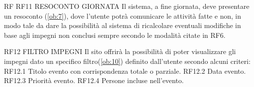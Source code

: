 \begin {listaPersonale}{RF}
RF11 RESOCONTO GIORNATA
Il sistema, a fine giornata, deve presentare un resoconto (\ref{ob:7}), dove l'utente potrà
comunicare le attività fatte e non, in modo tale da dare la possibilità al sistema di 
ricalcolare eventuali modifiche in base agli impegni non conclusi sempre secondo le modalità citate in RF6.

RF12 FILTRO IMPEGNI 
Il sito offrirà la possibilità di poter visualizzare gli impegni dato un specifico filtro(\ref{ob:10}) definito dall’utente secondo alcuni criteri: 
RF12.1 Titolo evento con corrispondenza totale o parziale.
RF12.2 Data evento.
RF12.3 Priorità evento.
RF12.4 Persone incluse nell’evento.

\end{listaPersonale}